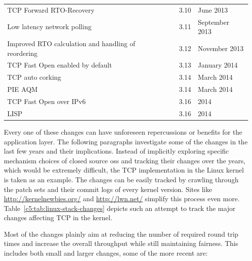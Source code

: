 \begin{table}[htbp]
\begin{tabu}{X[1.4]XX[0.4]X[0.7]}
	\gls{TCP} Forward RTO-Recovery & \cite{rfc5682} & 3.10 & June 2013 \\
	Low latency network polling & & 3.11 & September 2013 \\ %
	Improved RTO calculation and handling of reordering & & 3.12 & November 2013 \\ %
	\gls{TCP} Fast Open enabled by default & & 3.13 & January 2014 \\
	\gls{TCP} auto corking & & 3.14 & March 2014 \\ %
	PIE \acrshort{AQM} & & 3.14 & March 2014 \\ %
	\gls{TCP} Fast Open over IPv6 & & 3.16 & 2014 \\
	LISP & \cite{rfc6830} & 3.16 & 2014 \\
	\bottomrule
	\end{tabu}
\end{table}

Every one of these changes can have unforeseen repercussions or benefits for the application layer. The following paragraphs investigate some of the changes in the last few years and their implications.  Instead of implicitly exploring specific mechanism choices of closed source \glspl{os} and tracking their changes over the years, which would be extremely difficult, the \gls{TCP} implementation in the Linux kernel is taken as an example. The changes can be easily tracked by crawling through the patch sets and their commit logs of every kernel version. Sites like \url{http://kernelnewbies.org/} and \url{http://lwn.net/} simplify this process even more. Table~\ref{c5:tab:linux-stack-changes} depicts such an attempt to track the major changes affecting \gls{TCP} in the kernel.

Most of the changes plainly aim at reducing the number of required round trip times and increase the overall throughput while still maintaining fairness. This includes both small and larger changes, some of the more recent are:

